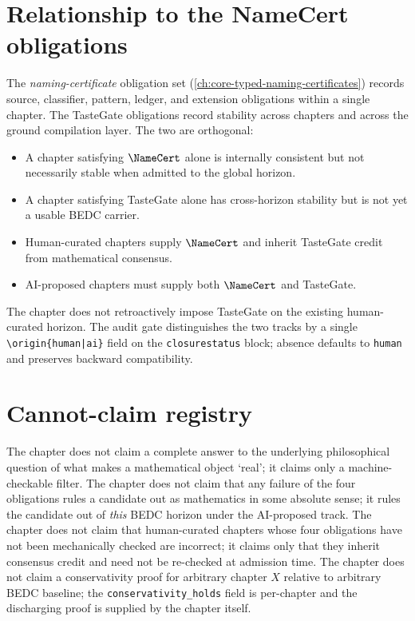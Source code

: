 
\section{Relationship to the NameCert obligations}
\label{sec:taste-gate-versus-namecert}

The \emph{naming-certificate} obligation set
(\autoref{ch:core-typed-naming-certificates}) records source, classifier,
pattern, ledger, and extension obligations within a single chapter. The
TasteGate obligations record stability across chapters and across the
ground compilation layer. The two are orthogonal:

\begin{itemize}
\item A chapter satisfying $\NameCert$ alone is internally consistent
      but not necessarily stable when admitted to the global horizon.
\item A chapter satisfying TasteGate alone has cross-horizon stability
      but is not yet a usable BEDC carrier.
\item Human-curated chapters supply $\NameCert$ and inherit TasteGate
      credit from mathematical consensus.
\item AI-proposed chapters must supply both $\NameCert$ and TasteGate.
\end{itemize}

The chapter does not retroactively impose TasteGate on the existing
human-curated horizon. The audit gate distinguishes the two tracks by a
single \texttt{\textbackslash origin\{human|ai\}} field on the
\texttt{closurestatus} block; absence defaults to \texttt{human} and
preserves backward compatibility.

\section{Cannot-claim registry}
\label{sec:taste-gate-cannot-claims}

The chapter does not claim a complete answer to the underlying
philosophical question of what makes a mathematical object `real';
it claims only a machine-checkable filter. The chapter does not claim
that any failure of the four obligations rules a candidate out as
mathematics in some absolute sense; it rules the candidate out of
\emph{this} BEDC horizon under the AI-proposed track. The chapter does
not claim that human-curated chapters whose four obligations have not
been mechanically checked are incorrect; it claims only that they
inherit consensus credit and need not be re-checked at admission time.
The chapter does not claim a conservativity proof for arbitrary chapter
$X$ relative to arbitrary BEDC baseline; the
\texttt{conservativity\_holds} field is per-chapter and the discharging
proof is supplied by the chapter itself.
